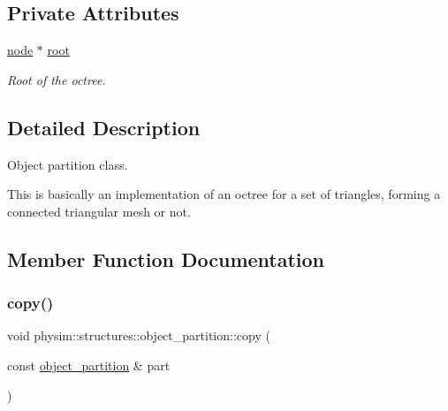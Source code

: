 \subsection*{Private Attributes}
\begin{DoxyCompactItemize}
\item 
\mbox{\label{classphysim_1_1structures_1_1object__partition_a4ae621816ca99166a33e173255f706c6}} 
\hyperlink{structphysim_1_1structures_1_1object__partition_1_1node}{node} $\ast$ \hyperlink{classphysim_1_1structures_1_1object__partition_a4ae621816ca99166a33e173255f706c6}{root}
\begin{DoxyCompactList}\small\item\em Root of the octree. \end{DoxyCompactList}\end{DoxyCompactItemize}


\subsection{Detailed Description}
Object partition class. 

This is basically an implementation of an octree for a set of triangles, forming a connected triangular mesh or not. 

\subsection{Member Function Documentation}
\mbox{\label{classphysim_1_1structures_1_1object__partition_ab3916ebd7be8c1d6404252cd413aa0db}} 
\subsubsection{\texorpdfstring{copy()}{copy()}}
{\footnotesize\ttfamily void physim\+::structures\+::object\+\_\+partition\+::copy (\begin{DoxyParamCaption}\item[{const \hyperlink{classphysim_1_1structures_1_1object__partition}{object\+\_\+partition} \&}]{part }\end{DoxyParamCaption})}



